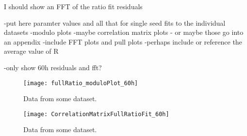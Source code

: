 I should show an FFT of the ratio fit residuals 



-put here paramter values and all that for single seed fits to the individual datasets
-modulo plots
-maybe correlation matrix plots - or maybe those go into an appendix
-include FFT plots and pull plots 
-perhaps include or reference the average value of R

-only show 60h residuals and fft?



\begin{figure}[]
    \centering
    \texttt{[image: fullRatio\_moduloPlot\_60h]}
    \caption[]{Data from some dataset.}
    \label{fig:}
\end{figure}


\begin{figure}[]
    \centering
    \texttt{[image: CorrelationMatrixFullRatioFit\_60h]}
    \caption[]{Data from some dataset.}
    \label{fig:}
\end{figure}


